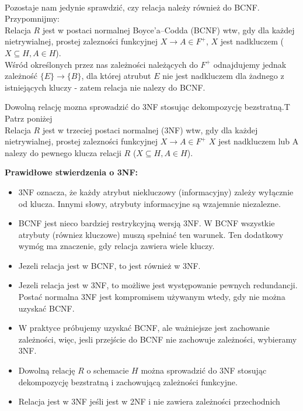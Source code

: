 {\\}
{Pozostaje nam jedynie sprawdzić, czy relacja należy również do BCNF. Przypomnijmy: \\
Relacja $R$ jest w postaci normalnej Boyce’a–Codda (BCNF) wtw, gdy dla każdej nietrywialnej, prostej zalezności funkcyjnej $X \rightarrow A \in F^+ $, $X$ jest nadkluczem ($X \subseteq H, A \in H$). \\
Wśród określonych przez nas zależności należących do $F^+$ odnajdujemy jednak zależność $ \{E\} \rightarrow \{B\}$, dla której atrubut $E$ nie jest nadkluczem dla żadnego z istniejących kluczy - zatem relacja nie nalezy do BCNF.}
\noindent

{Dowolną relację mozna sprowadzić do 3NF stosując dekompozycję bezstratną.}{T}
{Patrz poniżej}{\\}
\noindent Relacja $R$ jest w trzeciej postaci normalnej (3NF) wtw, gdy dla każdej nietrywialnej, prostej zalezności funkcyjnej $X \rightarrow A \in F^+$ $X$ jest nadkluczem lub A nalezy do pewnego klucza relacji $R$ ($X \subseteq H, A \in H$).
\vspace{0.2cm}

\noindent \textbf{Prawidłowe stwierdzenia o 3NF:}
\begin{itemize}
  \item 3NF oznacza, że każdy atrybut niekluczowy (informacyjny) zależy wyłącznie od klucza. Innymi słowy, atrybuty informacyjne są wzajemnie niezalezne.
  \item BCNF jest nieco bardziej restrykcyjną wersją 3NF. W BCNF wszystkie atrybuty (równiez kluczowe) muszą spełniać ten warunek. Ten dodatkowy wymóg ma znaczenie, gdy relacja zawiera wiele kluczy.
  \item Jezeli relacja jest w BCNF, to jest również w 3NF.
  \item Jezeli relacja jest w 3NF, to możliwe jest występowanie pewnych redundancji. Postać normalna 3NF jest kompromisem używanym wtedy, gdy nie można uzyskać BCNF.
  \item W praktyce próbujemy uzyskać BCNF, ale ważniejsze jest zachowanie zależności, więc, jesli przejście do BCNF nie zachowuje zależności, wybieramy 3NF.
  \item Dowolną relację $R$ o schemacie $H$ można sprowadzić do 3NF stosując dekompozycję bezstratną i zachowującą zależności funkcyjne. 
  \item Relacja jest w 3NF jeśli jest w 2NF i nie zawiera zależności przechodnich
\end{itemize}

